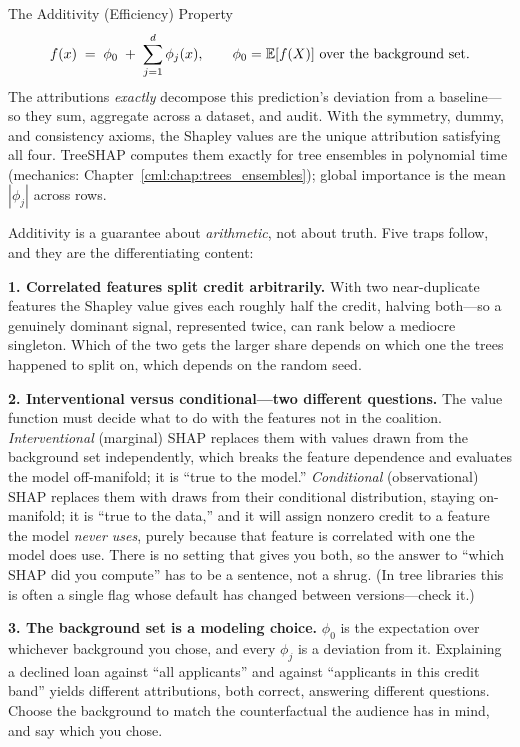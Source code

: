 \begin{mathresult}{The Additivity (Efficiency) Property}
\begin{equation}
f(x) \;=\; \phi_0 \;+\; \sum_{j=1}^{d} \phi_j(x), \qquad \phi_0 = \operatorname{\mathbb{E}}[f(X)] \text{ over the background set.}
\end{equation}
The attributions \emph{exactly} decompose this prediction's deviation from a baseline---so they sum, aggregate across a dataset, and audit. With the symmetry, dummy, and consistency axioms, the Shapley values are the unique attribution satisfying all four. TreeSHAP computes them exactly for tree ensembles in polynomial time (mechanics: Chapter~\ref{cml:chap:trees_ensembles}); global importance is the mean $|\phi_j|$ across rows.
\end{mathresult}

Additivity is a guarantee about \emph{arithmetic}, not about truth. Five traps follow, and they are the differentiating content:

\textbf{1. Correlated features split credit arbitrarily.} With two near-duplicate features the Shapley value gives each roughly half the credit, halving both---so a genuinely dominant signal, represented twice, can rank below a mediocre singleton. Which of the two gets the larger share depends on which one the trees happened to split on, which depends on the random seed.

\textbf{2. Interventional versus conditional---two different questions.} The value function must decide what to do with the features not in the coalition. \emph{Interventional} (marginal) SHAP replaces them with values drawn from the background set independently, which breaks the feature dependence and evaluates the model off-manifold; it is ``true to the model.'' \emph{Conditional} (observational) SHAP replaces them with draws from their conditional distribution, staying on-manifold; it is ``true to the data,'' and it will assign nonzero credit to a feature the model \emph{never uses}, purely because that feature is correlated with one the model does use. There is no setting that gives you both, so the answer to ``which SHAP did you compute'' has to be a sentence, not a shrug. (In tree libraries this is often a single flag whose default has changed between versions---check it.)

\textbf{3. The background set is a modeling choice.} $\phi_0$ is the expectation over whichever background you chose, and every $\phi_j$ is a deviation from it. Explaining a declined loan against ``all applicants'' and against ``applicants in this credit band'' yields different attributions, both correct, answering different questions. Choose the background to match the counterfactual the audience has in mind, and say which you chose.

